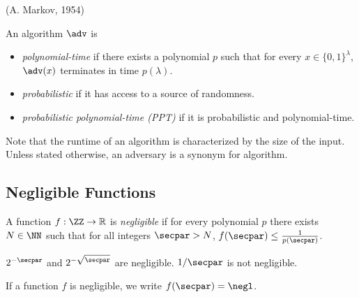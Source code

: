  (A. Markov, 1954)

\begin{definition}
An algorithm $\adv$ is
\begin{itemize}
\item \emph{polynomial-time} if there exists a polynomial $p$ such that for every $x \in \{0,1\}^\lambda$, $\adv(x)$ terminates in time $p(\lambda)$.
\item \emph{probabilistic} if it has access to a source of randomness.
\item \emph{probabilistic polynomial-time (PPT)} if it is probabilistic and polynomial-time.
\end{itemize}
\end{definition}

Note that the runtime of an algorithm is characterized by the size of the input.
Unless stated otherwise, an adversary is a synonym for algorithm.

\subsection{Negligible Functions}



\begin{definition}
A function $f: \ZZ \rightarrow \mathbb{R}$ is \emph{negligible} if for every polynomial $p$ there exists $N \in \NN$ such that for all integers $\secpar > N$, $f(\secpar) \le \frac{1}{p(\secpar)}$.
\end{definition}

\begin{example}
  $2^{-\secpar}$ and $2^{-\sqrt{\secpar}}$ are negligible. $1/\secpar$ is not negligible.
\end{example}

If a function $f$ is negligible, we write $f(\secpar) = \negl$.



